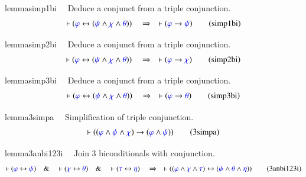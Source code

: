 \begin{restatable}{lemma}{simp1bi}~~ Deduce a conjunct from a triple
conjunction.  ~
\begin{align}
\vdash ( \mw{\varphi} \leftrightarrow ( \mw{\psi} \wedge \mw{\chi} \wedge
    \mw{\theta} ) )\quad\Rightarrow\quad \vdash ( \mw{\varphi} \rightarrow
    \mw{\psi} )\label{eq:simp1bi}\tag{simp1bi}
\end{align}
\end{restatable}

\begin{restatable}{lemma}{simp2bi}~~ Deduce a conjunct from a triple
conjunction.  ~
\begin{align}
\vdash ( \mw{\varphi} \leftrightarrow ( \mw{\psi} \wedge \mw{\chi} \wedge
    \mw{\theta} ) )\quad\Rightarrow\quad \vdash ( \mw{\varphi} \rightarrow
    \mw{\chi} )\label{eq:simp2bi}\tag{simp2bi}
\end{align}
\end{restatable}

\begin{restatable}{lemma}{simp3bi}~~ Deduce a conjunct from a triple
conjunction.  ~
\begin{align}
\vdash ( \mw{\varphi} \leftrightarrow ( \mw{\psi} \wedge \mw{\chi} \wedge
    \mw{\theta} ) )\quad\Rightarrow\quad \vdash ( \mw{\varphi} \rightarrow
    \mw{\theta} )\label{eq:simp3bi}\tag{simp3bi}
\end{align}
\end{restatable}

\begin{restatable}{lemma}{3simpa}~~ Simplification of triple conjunction. 
~
     ~
\begin{align}
\vdash ( ( \mw{\varphi} \wedge \mw{\psi} \wedge \mw{\chi} ) \rightarrow (
    \mw{\varphi} \wedge \mw{\psi} ) )\label{eq:3simpa}\tag{3simpa}
\end{align}
\end{restatable}

\begin{restatable}{lemma}{3anbi123i}~~ Join 3 biconditionals with conjunction. 
~
\begin{align}
\vdash ( \mw{\varphi} \leftrightarrow \mw{\psi} )\quad\&\quad \vdash (
    \mw{\chi} \leftrightarrow \mw{\theta} )\quad\&\quad \vdash ( \mw{\tau}
    \leftrightarrow \mw{\eta} )\quad\Rightarrow\quad \vdash ( ( \mw{\varphi}
    \wedge \mw{\chi} \wedge \mw{\tau} ) \leftrightarrow ( \mw{\psi} \wedge
    \mw{\theta} \wedge \mw{\eta} ) )\label{eq:3anbi123i}\tag{3anbi123i}
\end{align}
\end{restatable}

